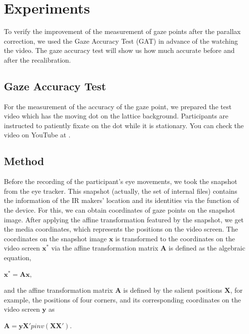 \documentclass{article}
\begin{document}
\section{Experiments}

To verify the improvement of the measurement of gaze points after the parallax correction, we used the Gaze Accuracy Test (GAT) in advance of the watching the video. The gaze accuracy test will show us how much accurate before and after the recalibration.

\subsection{Gaze Accuracy Test}
For the measurement of the accuracy of the gaze point, we prepared the test video which has the moving dot on the lattice background. Participants are instructed to patiently fixate on the dot while it is stationary. You can check the video on YouTube at \citet{GAT}.

\subsection{Method}
Before the recording of the participant's eye movements, we took the snapshot from the eye tracker. This snapshot (actually, the set of internal files) contains the information of the IR makers' location and its identities via the function of the device. For this, we can obtain coordinates of gaze points on the snapshot image. After applying the affine transformation featured by the snapshot, we get the media coordinates, which represents the positions on the video screen. The coordinates on the snapshot image $\mathbf{x}$ is transformed to the coordinates on the video screen $\mathbf{x^\ast}$ via the affine transformation matrix $\mathbf{A}$ is defined as the algebraic equation, 

\begin{center}
$\mathbf{x^\ast} = \mathbf{Ax},$\\
\end{center}

and the affine transformation matrix $\mathbf{A}$ is defined by the salient positions $\mathbf{X}$, for example, the positions of four corners, and its corresponding coordinates on the video screen $\mathbf{y}$ as

\begin{center}
$\mathbf{A} = \mathbf{yX'}pinv(\mathbf{XX'})$.
\end{center}
\end{document}

